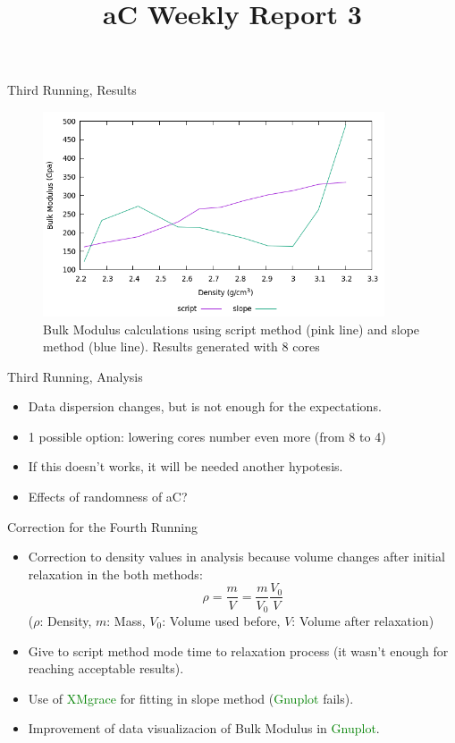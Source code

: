 \documentclass[11pt]{beamer}
\begin{document}
\title[aC-WR3]{aC Weekly Report 3} 
\begin{frame}
\titlepage 
\end{frame}
\begin{frame}{Third Running, Results}
\begin{figure}
 \centering
    \includegraphics[width=0.9\textwidth]{plot-yeah3.png}
 \caption{Bulk Modulus calculations using script method (pink line) and slope method (blue line). Results generated with 8 cores}
 \end{figure}
\end{frame}
\begin{frame}{Third Running, Analysis}
\begin{itemize}
    \item Data dispersion changes, but is not enough for the expectations.
    \item 1 possible option: lowering cores number even more (from 8 to 4)
    \item If this doesn't works, it will be needed another hypotesis.
    \item Effects of randomness of aC?
\end{itemize}
\end{frame}
\begin{frame}{Correction for the Fourth Running}
\begin{itemize}
    \item Correction to density values in analysis because volume changes after initial relaxation in the both methods:
    \begin{equation}\rho=\frac{m}{V}=\frac{m}{V_0}\frac{V_0}{V}\end{equation}
    ($\rho$: Density, $m$: Mass, $V_0$: Volume used before, $V$: Volume after relaxation)
    \item Give to script method mode time to relaxation process (it wasn't enough for reaching acceptable results).
    \item Use of \textcolor{green}{XMgrace} for fitting in slope method (\textcolor{green}{Gnuplot} fails).
    \item Improvement of data visualizacion of Bulk Modulus in \textcolor{green}{Gnuplot}.
\end{itemize}
\end{frame}
\end{document}
